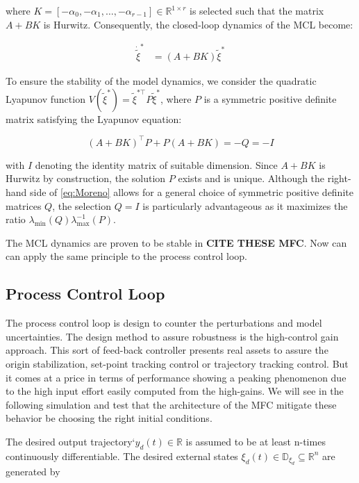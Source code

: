 where \(K = [-\alpha_0, -\alpha_1, \ldots, -\alpha_{r-1}] \in \mathbb{R}^{1 \times r}\) is selected such that the matrix \(A + BK\) is Hurwitz. Consequently, the closed-loop dynamics of the MCL become:

\begin{align}
\dot{\tilde{\xi}}^* &= (A + BK)\tilde{\xi}^*
\end{align}

To ensure the stability of the model dynamics, we consider the quadratic Lyapunov function \(V(\tilde{\xi}^*) = \tilde{\xi}^{*\top} P \tilde{\xi}^*\), where \(P\) is a symmetric positive definite matrix satisfying the Lyapunov equation:

\begin{equation}
\label{eq:Moreno}
(A + BK)^\top P + P(A + BK) = -Q = -I
\end{equation}

with \(I\) denoting the identity matrix of suitable dimension. Since \(A + BK\) is Hurwitz by construction, the solution \(P\) exists and is unique. Although the right-hand side of \ref{eq:Moreno} allows for a general choice of symmetric positive definite matrices \(Q\), the selection \(Q = I\) is particularly advantageous as it maximizes the ratio \(\lambda_{\min}(Q) \lambda_{\max}^{-1}(P)\).

The MCL dynamics are proven to be stable in \textbf{CITE THESE MFC}. Now can can apply the same principle to the process control loop.

\subsection{Process Control Loop}

The process control loop is design to counter the perturbations and model uncertainties. The design method to assure robustness is the high-control gain approach. This sort of feed-back controller presents real assets to assure the origin stabilization, set-point tracking control or trajectory tracking control. But it comes at a price in terms of performance showing a peaking phenomenon due to the high input effort easily computed from the high-gains. We will see in the following simulation and test that the architecture of the MFC mitigate these behavior be choosing the right initial conditions.

The desired output trajectory`\(y_d(t) \in \mathbb{R}\) is assumed to be at least n-times continuously differentiable. The desired external states \(\xi_d(t) \in \mathbb{D}_{\xi_d}  \subseteq \mathbb{R}^n\) are generated by 


